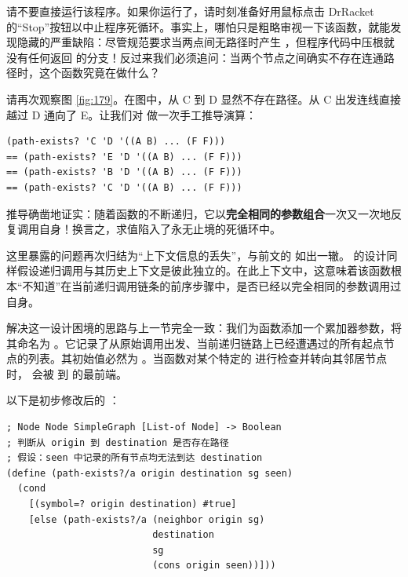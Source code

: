 \begin{notebox}[警告：请勿贸然运行该程序！]
请不要直接运行该程序。如果你运行了，请时刻准备好用鼠标点击 DrRacket 的“Stop”按钮以中止程序死循环。事实上，哪怕只是粗略审视一下该函数，就能发现隐藏的严重缺陷：尽管规范要求当两点间无路径时产生 ，但程序代码中压根就没有任何返回  的分支！反过来我们必须追问：当两个节点之间确实不存在连通路径时，这个函数究竟在做什么？
\end{notebox}

请再次观察图 \ref{fig:179}。在图中，从 C 到 D 显然不存在路径。从 C 出发连线直接越过 D 通向了 E。让我们对  做一次手工推导演算：

\begin{lstlisting}[language=BSL]
   (path-exists? 'C 'D '((A B) ... (F F)))
== (path-exists? 'E 'D '((A B) ... (F F)))
== (path-exists? 'B 'D '((A B) ... (F F)))
== (path-exists? 'C 'D '((A B) ... (F F)))
\end{lstlisting}

推导确凿地证实：随着函数的不断递归，它以\textbf{完全相同的参数组合}一次又一次地反复调用自身！换言之，求值陷入了永无止境的死循环中。

这里暴露的问题再次归结为“上下文信息的丢失”，与前文的  如出一辙。 的设计同样假设递归调用与其历史上下文是彼此独立的。在此上下文中，这意味着该函数根本“不知道”在当前递归调用链条的前序步骤中，是否已经以完全相同的参数调用过自身。

解决这一设计困境的思路与上一节完全一致：我们为函数添加一个累加器参数，将其命名为 。它记录了从原始调用出发、当前递归链路上已经遭遇过的所有起点节点的列表。其初始值必然为 \code{\textquotesingle()}。当函数对某个特定的  进行检查并转向其邻居节点时， 会被  到  的最前端。

以下是初步修改后的 ：

\begin{lstlisting}[language=BSL]
; Node Node SimpleGraph [List-of Node] -> Boolean
; 判断从 origin 到 destination 是否存在路径
; 假设：seen 中记录的所有节点均无法到达 destination
(define (path-exists?/a origin destination sg seen)
  (cond
    [(symbol=? origin destination) #true]
    [else (path-exists?/a (neighbor origin sg)
                          destination
                          sg
                          (cons origin seen))]))
\end{lstlisting}

